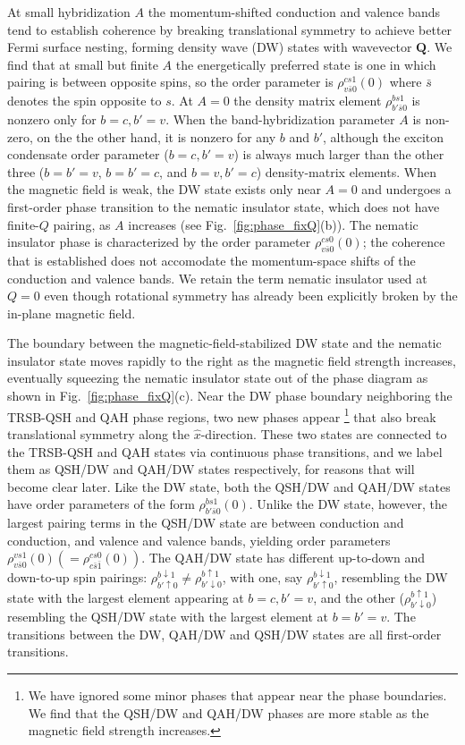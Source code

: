 \documentclass[reprint,aps,superscriptaddress]{revtex4-2}
\begin{document}
At small hybridization $A$ the momentum-shifted conduction and valence bands tend to establish coherence by breaking translational symmetry to achieve better Fermi surface nesting, forming density wave (DW) states with wavevector $\bm Q$. 
We find that at small but finite $A$ the energetically preferred state is one in which
pairing is between opposite spins, so the order parameter is $\rho_{v\bar s 0}^{cs1}(0)$ where $\bar{s}$ denotes the spin 
opposite to $s$.
At $A=0$ the density matrix element $\rho_{b'\bar s 0}^{bs1}$ is nonzero only for $b=c,b'=v$.
When the band-hybridization parameter $A$ is non-zero, on the the other hand, 
it is nonzero for any $b$ and $b'$, although the exciton condensate order parameter ($b=c,b'=v$) is always much larger than the other three ($b=b'=v$, $b=b'=c$, and $b=v,b'=c$) density-matrix elements.
When the magnetic field is weak, the DW state exists only near $A=0$ and undergoes a first-order phase transition to the nematic insulator state, which does not have finite-$Q$ pairing, as $A$ increases (see Fig.~\ref{fig:phase_fixQ}(b)). 
The nematic insulator phase is characterized by the order parameter $\rho_{v\bar s 0}^{cs0}(0)$; the coherence that
is established does not accomodate the momentum-space shifts of the conduction and valence bands.
We retain the term nematic insulator used at $Q=0$ even though rotational symmetry has already been explicitly 
broken by the in-plane magnetic field.

The boundary between the magnetic-field-stabilized DW state and the nematic insulator 
state moves rapidly to the right as the magnetic field strength increases, eventually 
squeezing the nematic insulator state out of the phase diagram as shown in Fig.~\ref{fig:phase_fixQ}(c). 
Near the DW phase boundary neighboring the TRSB-QSH and QAH phase regions, two new phases appear \footnote{We have ignored some minor phases that appear near the phase boundaries. We find that the QSH/DW and QAH/DW phases are more stable as the magnetic field strength increases.} that also break translational symmetry along the $\hat x$-direction. These two states are connected to the TRSB-QSH and QAH states via continuous phase transitions, and we label them as QSH/DW and QAH/DW states respectively, for reasons that will become clear later. Like the DW state, both the QSH/DW and QAH/DW states have order parameters of the form $\rho_{b'\bar s 0}^{bs1}(0)$. Unlike the DW state, however, the largest pairing terms in the QSH/DW state are between conduction and conduction, and valence and valence bands, yielding order parameters $\rho_{v\bar{s}0}^{vs1}(0)(=\rho_{c\bar{s}\bar{1}}^{cs0}(0))$. The QAH/DW state has different up-to-down and down-to-up spin pairings: $\rho_{b'\uparrow 0}^{b\downarrow 1} \ne \rho_{b'\downarrow 0}^{b\uparrow 1}$, with one, say $\rho_{b'\uparrow 0}^{b\downarrow 1}$, resembling the DW state with the largest element appearing at $b=c,b'=v$, and the other ($\rho_{b'\downarrow 0}^{b\uparrow 1}$)
resembling the QSH/DW state with the largest element at $b=b'=v$.
The transitions between the DW, QAH/DW and QSH/DW states are all first-order transitions.
\end{document}
